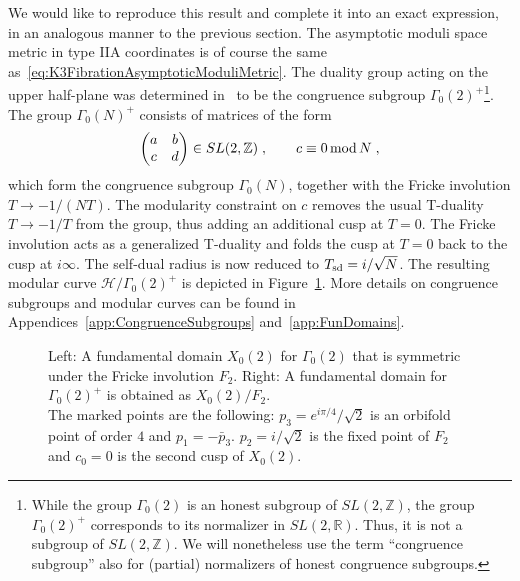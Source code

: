 \documentclass[11pt,a4paper]{article}
\numberwithin{equation}{section}
\numberwithin{table}{section}\setlength{\multlinegap}{25pt}
\begin{document}
We would like to reproduce this result and complete it into an exact expression, in an analogous manner to the previous section. The asymptotic moduli space metric in type IIA coordinates is of course the same as~\eqref{eq:K3FibrationAsymptoticModuliMetric}. The duality group acting on the upper half-plane was determined in~\cite{Lian:1995js,Klemm:1995tj} to be the congruence subgroup $\Gamma_0(2)^+$\footnote{While the group $\Gamma_0(2)$ is an honest subgroup of $SL(2,\mathbb{Z})$, the group $\Gamma_0(2)^+$ corresponds to its normalizer in $SL(2,\mathbb{R})$. Thus, it is not a subgroup of $SL(2,\mathbb{Z})$. We will nonetheless use the term ``congruence subgroup'' also for (partial) normalizers of honest congruence subgroups.}. The group $\Gamma_0(N)^+$ consists of matrices of the form
\begin{equation}
    \begin{pmatrix}
        a&b\\c&d\\
    \end{pmatrix}
    \in SL(2,\mathbb{Z})\;, \qquad c\equiv 0\,\textup{mod}\,N\;,
\end{equation}
which form the congruence subgroup $\Gamma_0(N)$, together with the Fricke involution $T\to-1/(NT)$. The modularity constraint on $c$ removes the usual T-duality $T\to -1/T$ from the group, thus adding an additional cusp at $T=0$. The Fricke involution acts as a generalized T-duality and folds the cusp at $T=0$ back to the cusp at $i\infty$. The self-dual radius is now reduced to $T_\textup{sd}=i/\sqrt{N}$. The resulting modular curve $\mathcal{H}/\Gamma_0(2)^+$ is depicted in Figure~\ref{fig:gamma2fundomain}. More details on congruence subgroups and modular curves can be found in Appendices~\ref{app:CongruenceSubgroups} and~\ref{app:FunDomains}.
\begin{figure}
    \centering
    \quad
    \raisebox{-0.5\height}{$\Longrightarrow$}
    \quad
    \caption{Left: A fundamental domain $X_0(2)$ for $\Gamma_0(2)$ that is symmetric under the Fricke involution $F_2$. Right: A fundamental domain for $\Gamma_0(2)^+$ is obtained as $X_0(2)/F_2$.\\The marked points are the following: $p_3=e^{i\pi/4}/\sqrt{2}$ is an orbifold point of order $4$ and $p_1=-\bar{p}_3$. $p_2=i/\sqrt{2}$ is the fixed point of $F_2$ and $c_0=0$ is the second cusp of $X_0(2)$.}
    \label{fig:gamma2fundomain}
\end{figure}
\end{document}
